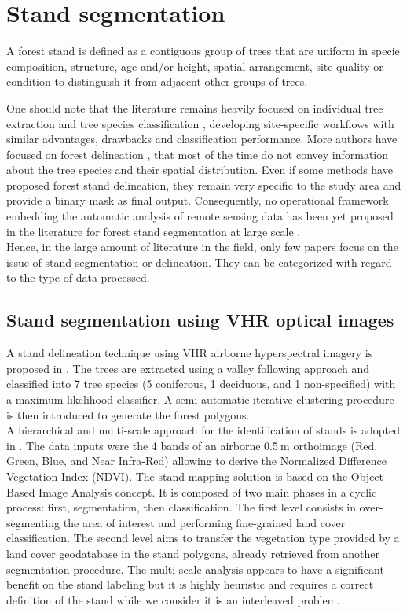 \section{Stand segmentation}
\label{sec:C1_stand}
A forest stand is defined as a contiguous group of trees that are uniform in specie composition, structure, age and/or height, spatial arrangement, site quality or condition to distinguish it from adjacent other groups of trees.

One should note that the literature remains heavily focused on individual tree extraction and tree species classification \citep{dalponte2014tree, vega2014ptrees, kandare2014new}, developing site-specific workflows with similar advantages, drawbacks and classification performance. More authors have focused on forest delineation \citep{eysn2012forest, wang2012forest, radoux2007quantitative}, that most of the time do not convey information about the tree species and their spatial distribution. Even if some methods have proposed forest stand delineation, they remain very specific to the study area and provide a binary mask as final output. Consequently, no operational framework embedding the automatic analysis of remote sensing data has been yet proposed in the literature for forest stand segmentation at large scale \citep{clement_IJPRS}. \\

Hence, in the large amount of literature in the field, only few papers focus on the issue of stand segmentation or delineation. They can be categorized with regard to the type of data processed. \\
\subsection{Stand segmentation using VHR optical images}
A stand delineation technique using VHR airborne hyperspectral imagery is proposed in \citep{leckie2003stand}. The trees are extracted using a valley following approach and classified into 7 tree species (5 coniferous, 1 deciduous, and 1 non-specified) with a maximum likelihood classifier. A semi-automatic iterative clustering procedure is then introduced to generate the forest polygons.\\

A hierarchical and multi-scale approach for the identification of stands is adopted in \citep{hernando2012spatial}. The data inputs were the 4 bands of an airborne 0.5$\:$m orthoimage (Red, Green, Blue, and Near Infra-Red) allowing to derive the Normalized Difference Vegetation Index (NDVI). The stand mapping solution is based on the Object-Based Image Analysis concept. It is composed of two main phases in a cyclic process: first, segmentation, then classification. The first level consists in over-segmenting the area of interest and performing fine-grained land cover classification. The second level aims to transfer the vegetation type provided by a land cover geodatabase in the stand polygons, already retrieved from another segmentation procedure. The multi-scale analysis appears to have a significant benefit on the stand labeling but it is highly heuristic and requires a correct definition of the stand while we consider it is an interleaved problem. \\

